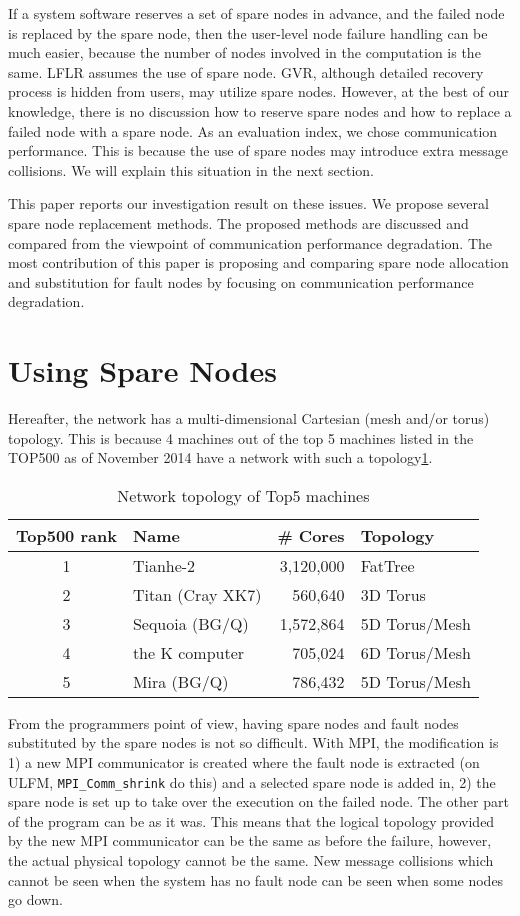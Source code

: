 \documentclass[10pt,conference,a4paper,fleqn]{IEEEtran}
\begin{document}
If a system software reserves a set of spare nodes in advance, and the
failed node is replaced by the spare node, then the user-level  
node failure handling can be much easier, because the number of nodes
involved in the computation is the same. LFLR assumes the use of
spare node. GVR, although detailed recovery process is hidden from
users, may utilize spare nodes. However, at the best of our knowledge,
there is no discussion how to reserve spare nodes and how to replace
a failed node with a spare node. As an evaluation index, we chose
communication performance. This is because the use of spare nodes may
introduce extra message collisions. We will explain this situation in
the next section.

This paper reports our investigation result on these issues. We
propose several spare node replacement methods. The proposed methods
are discussed and compared from the viewpoint of communication
performance degradation. The most contribution of this paper is
proposing and comparing spare node allocation and substitution for
fault nodes by focusing on communication performance degradation.

\section{Using Spare Nodes}

Hereafter, the network has a multi-dimensional Cartesian (mesh and/or
torus) topology. This is because 4 machines out of the top 5 machines
listed in the TOP500\cite{top500} as of November 2014 have a network
with such a topology\ref{tbl:top5-network}. 

\begin{table}[htb]
\centering
\caption{Network topology of Top5 machines\cite{top500}}
\label{tbl:top5-network}
\begin{tabular}{c|l|r|l} 
\hline
Top500 rank & Name & \# Cores & Topology \\
\hline
1 & Tianhe-2 & 3,120,000 & FatTree \\
2 & Titan (Cray XK7) & 560,640 & 3D Torus \\
3 & Sequoia (BG/Q) & 1,572,864 & 5D Torus/Mesh \\
4 & the K computer & 705,024 & 6D Torus/Mesh \\ 
5 & Mira (BG/Q) & 786,432 & 5D Torus/Mesh \\
\hline
\end{tabular}
\end{table}

From the programmers point of view, having spare nodes and fault nodes
substituted by the spare nodes is not so difficult. With MPI, the
modification is 1) a new MPI communicator is created where the fault
node is extracted (on ULFM, {\tt MPI\_Comm\_shrink} do this) and a
selected spare node is added in, 2) the spare node is set up to take
over the execution on the failed node. The other part of the program
can be as it was. This means that the logical topology provided by
the new MPI communicator can be the same as before the failure,
however, the actual physical topology cannot be the same. New message
collisions which cannot be seen when the system has no fault node can
be seen when some nodes go down. 
\end{document}
